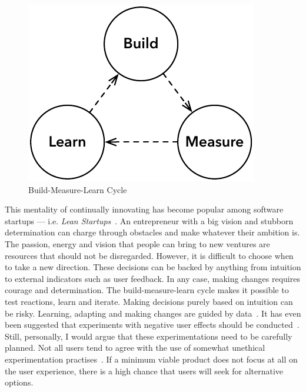 \documentclass[english]{tktltiki2}
\begin{document}
\begin{figure}[h!]

    \centering

    \includegraphics[scale = 0.6]{figures/build-measure-learn}

    \caption{Build-Measure-Learn Cycle}
    \label{figure:build-measure-learn}

    \vspace{1cm}

\end{figure}

This mentality of continually innovating has become popular among software startups — i.e. \emph{Lean Startups}~\cite{Rie11}. An entrepreneur with a big vision and stubborn determination can charge through obstacles and make whatever their ambition is. The passion, energy and vision that people can bring to new ventures are resources that should not be disregarded. However, it is difficult to choose when to take a new direction. These decisions can be backed by anything from intuition to external indicators such as user feedback. In any case, making changes requires courage and determination. The build-measure-learn cycle makes it possible to test reactions, learn and iterate. Making decisions purely based on intuition can be risky. Learning, adapting and making changes are guided by data~\cite{Rie11}. It has even been suggested that experiments with negative user effects should be conducted~\cite{KLS09, KDF12, Bos12}. Still, personally, I would argue that these experimentations need to be carefully planned. Not all users tend to agree with the use of somewhat unethical experimentation practises~\cite{RM13}. If a minimum viable product does not focus at all on the user experience, there is a high chance that users will seek for alternative options.
\end{document}
